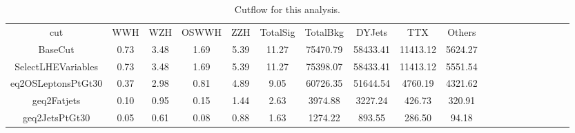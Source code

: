 \begin{table}[htp]
\begin{center}
\begin{tabular}{ccccccccccccccccccc}
\hline
\hline
       cut         & WWH  & WZH  & OSWWH &  ZZH  & TotalSig & TotalBkg &  DYJets  &   TTX    & Others  \\
     BaseCut       & 0.73 & 3.48 & 1.69  & 5.39  &  11.27   & 75470.79 & 58433.41 & 11413.12 & 5624.27 \\
SelectLHEVariables & 0.73 & 3.48 & 1.69  & 5.39  &  11.27   & 75398.07 & 58433.41 & 11413.12 & 5551.54 \\
eq2OSLeptonsPtGt30 & 0.37 & 2.98 & 0.81  & 4.89  &   9.05   & 60726.35 & 51644.54 & 4760.19  & 4321.62 \\
   geq2Fatjets     & 0.10 & 0.95 & 0.15  & 1.44  &   2.63   & 3974.88  & 3227.24  &  426.73  & 320.91  \\
  geq2JetsPtGt30   & 0.05 & 0.61 & 0.08  & 0.88  &   1.63   & 1274.22  &  893.55  &  286.50  &  94.18  \\
\hline
\hline
\end{tabular}
\end{center}
\caption{Cutflow for this analysis.}
\label{tab:cutflow}
\end{table}
